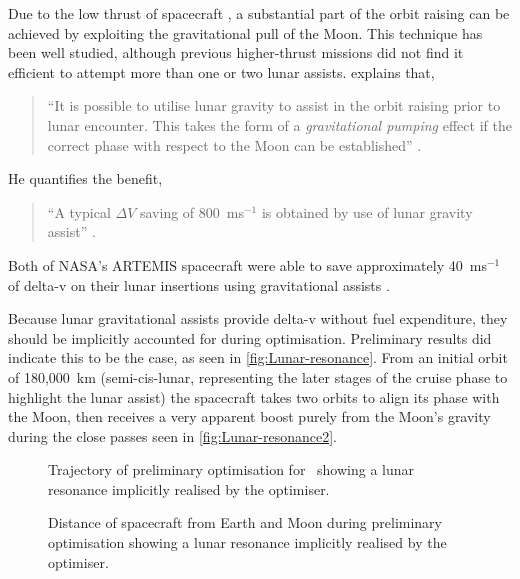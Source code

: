 Due to the low thrust of spacecraft \BW, a substantial part of the orbit raising can be achieved by exploiting the gravitational pull of the Moon. This technique has been well studied, although previous higher-thrust missions did not find it efficient to attempt more than one or two lunar assists. \textcite{Kemble2006} explains that,
\begin{quotation}
\enquote{It is possible to utilise lunar gravity to assist in the orbit raising prior to lunar encounter. This takes the form of a \emph{gravitational pumping} effect if the correct phase with respect to the Moon can be established} \parencite[p.249]{Kemble2006}. 
\end{quotation}
He quantifies the benefit,
\begin{quotation}
\enquote{A typical $\Delta V$ saving of 800~ms$^{-1}$ is obtained by use of lunar gravity assist} \parencite[p.248]{Kemble2006}.
\end{quotation}
Both of NASA's ARTEMIS spacecraft were able to save approximately 40~ms$^{-1}$ of delta-v on their lunar insertions using gravitational assists \parencite{Sweetser2011}.  

Because lunar gravitational assists provide delta-v without fuel expenditure, they should be implicitly accounted for during optimisation. Preliminary results did indicate this to be the case, as seen in \autoref{fig:Lunar-resonance}. From an initial orbit of 180,000~km (semi-cis-lunar, representing the later stages of the cruise phase to highlight the lunar assist) the spacecraft takes two orbits to align its phase with the Moon, then receives a very apparent boost purely from the Moon's gravity during the close passes seen in \autoref{fig:Lunar-resonance2}.

\begin{figure}
\centering
\def\svgwidth{\figurewidth}

\caption{Trajectory of preliminary optimisation for \BW\ showing a lunar resonance implicitly realised by the optimiser.} \label{fig:Lunar-resonance}
\end{figure}

\begin{figure}
\centering
\def\svgwidth{\figurewidth}

\caption{Distance of spacecraft from Earth and Moon during preliminary optimisation showing a lunar resonance implicitly realised by the optimiser.} \label{fig:Lunar-resonance2}
\end{figure}




